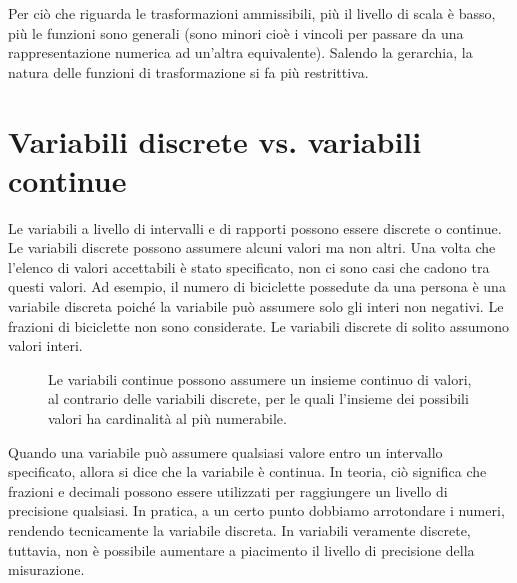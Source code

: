   \bigskip

Per ciò che riguarda le trasformazioni ammissibili, più il livello di scala è basso, più le funzioni sono generali (sono minori cioè i vincoli per passare da una rappresentazione numerica ad un'altra equivalente).  Salendo la gerarchia, la natura delle funzioni di trasformazione si fa più restrittiva.


\section{Variabili discrete vs. variabili continue}
\label{sec:DiscreteVsContinuous}

Le variabili a livello di intervalli e di rapporti possono essere discrete o continue. 
Le variabili discrete possono assumere alcuni valori ma non altri. 
Una volta che l'elenco di valori accettabili è stato specificato, non ci sono casi che cadono tra questi valori. 
Ad esempio, il numero di biciclette possedute da una persona è una variabile discreta poiché la variabile può assumere solo gli interi non negativi. 
Le frazioni di biciclette non sono considerate. 
Le variabili discrete di solito assumono valori interi.

\begin{figure}
\centering
{}
\caption{Le variabili continue possono assumere un insieme continuo di valori, al contrario delle variabili discrete, per le quali l'insieme dei possibili valori ha cardinalità al più numerabile.}
\label{fig:DiscreteContinuous}
\end{figure}

Quando una variabile può assumere qualsiasi valore entro un intervallo specificato, allora si dice che la variabile è continua. 
In teoria, ciò significa che frazioni e decimali possono essere utilizzati per raggiungere un livello di precisione qualsiasi. 
In pratica, a un certo punto dobbiamo arrotondare i numeri, rendendo tecnicamente la variabile discreta. 
In variabili veramente discrete, tuttavia, non è possibile aumentare a piacimento il livello di precisione della misurazione.

